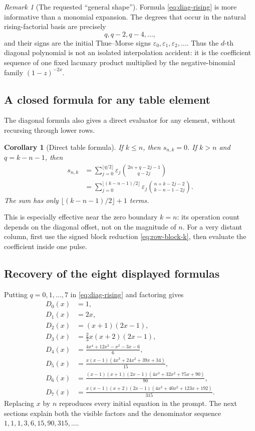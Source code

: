 \documentclass[11pt]{article}
\newtheorem{corollary}[theorem]{Corollary}
\theoremstyle{definition}
\theoremstyle{remark}
\newtheorem{remark}[theorem]{Remark}
\newcommand{\eps}{\varepsilon}
\newcommand{\Diag}{D}
\begin{document}
\begin{remark}[The requested ``general shape'']
Formula \cref{eq:diag-rising} is more informative than a monomial expansion.
The degrees that occur in the natural rising-factorial basis are precisely
\[
 q,q-2,q-4,\ldots,
\]
and their signs are the initial Thue--Morse signs
\(\eps_0,\eps_1,\eps_2,\ldots\).  Thus the \(d\)-th diagonal polynomial is
not an isolated interpolation accident: it is the coefficient sequence of
one fixed lacunary product multiplied by the negative-binomial family
\((1-z)^{-2x}\).
\end{remark}

\subsection{A closed formula for any table element}

The diagonal formula also gives a direct evaluator for any element, without
recursing through lower rows.

\begin{corollary}[Direct table formula]
If \(k\leq n\), then \(s_{n,k}=0\).  If \(k>n\) and
\(q=k-n-1\), then
\begin{align}
 s_{n,k}
 &=\sum_{j=0}^{\lfloor q/2\rfloor}\eps_j
   \binom{2n+q-2j-1}{q-2j}                                \label{eq:direct-q}\\
 &=\sum_{j=0}^{\lfloor(k-n-1)/2\rfloor}\eps_j
   \binom{n+k-2j-2}{k-n-1-2j}.                            \label{eq:direct-nk}
\end{align}
The sum has only \(\lfloor(k-n-1)/2\rfloor+1\) terms.
\end{corollary}

This is especially effective near the zero boundary \(k=n\): its operation
count depends on the diagonal offset, not on the magnitude of \(n\).  For a
very distant column, first use the signed block reduction
\cref{eq:row-block-k}, then evaluate the coefficient inside one pulse.

\subsection{Recovery of the eight displayed formulas}

Putting \(q=0,1,\ldots,7\) in \cref{eq:diag-rising} and factoring gives
\begin{align*}
 \Diag_0(x)&=1,\\
 \Diag_1(x)&=2x,\\
 \Diag_2(x)&=(x+1)(2x-1),\\
 \Diag_3(x)&=\frac23x(x+2)(2x-1),\\
 \Diag_4(x)&=\frac{4x^4+12x^3-x^2-3x-6}{6},\\
 \Diag_5(x)&=\frac{x(x-1)(4x^3+24x^2+39x+34)}{15},\\
 \Diag_6(x)&=\frac{(x-1)(x+1)(2x-1)
 (4x^3+32x^2+75x+90)}{90},\\
 \Diag_7(x)&=\frac{x(x-1)(x+2)(2x-1)
 (4x^3+40x^2+123x+192)}{315}.
\end{align*}
Replacing \(x\) by \(n\) reproduces every initial equation in the prompt.
The next sections explain both the visible factors and the denominator
sequence \(1,1,1,3,6,15,90,315,\ldots\).
\end{document}
